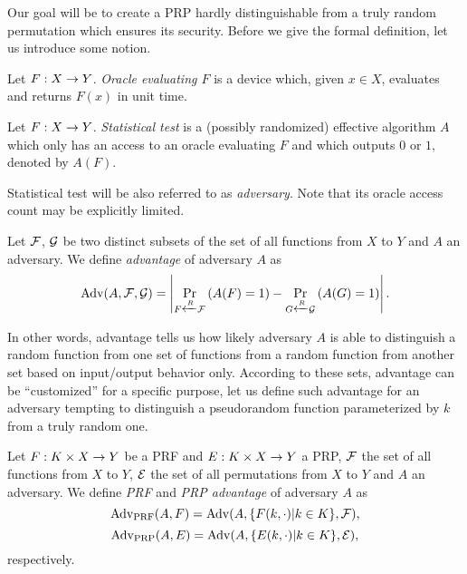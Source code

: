 Our goal will be to create a PRP hardly distinguishable from a truly random permutation which ensures its security. Before we give the formal definition, let us introduce some notion.

\begin{defn}[Oracle]
	Let $F:X\rightarrow Y$. {\em Oracle evaluating $F$} is a device which, given $x\in X$, evaluates and returns $F(x)$ in unit time.
\end{defn}

\begin{defn}   %
	Let $F:X\rightarrow Y$. {\em Statistical test} is a (possibly randomized) effective algorithm $A$ which only has an access to an oracle evaluating $F$ and which outputs $0$ or $1$, denoted by $A(F)$.
\end{defn}

\begin{note}
	Statistical test will be also referred to as {\em adversary}. Note that its oracle access count may be explicitly limited.
\end{note}


\begin{defn}[Advantage]
\label{def:advant}
	Let $\cal F$, $\cal G$ be two distinct subsets of the set of all functions from $X$ to $Y$ and $A$ an adversary. We define {\em advantage} of adversary $A$ as
	\[
		\operatorname*{Adv}(A,{\cal F},{\cal G}) = \left| \Pr\limits_{F\xleftarrow{R} {\cal F}}\left(A(F)=1\right) - \Pr\limits_{G\xleftarrow{R} {\cal G}}\left(A(G)=1\right) \right| .
	\]
\end{defn}

In other words, advantage tells us how likely adversary $A$ is able to distinguish a random function from one set of functions from a random function from another set based on input/output behavior only. According to these sets, advantage can be ``customized'' for a specific purpose, let us define such advantage for an adversary tempting to distinguish a pseudorandom function parameterized by $k$ from a truly random one.

\begin{defn}
\label{def:prfadvant}\label{def:prpadvant}
	Let $F: K\times X\rightarrow Y$ be a PRF and $E: K\times X\rightarrow Y$ a PRP, $\cal F$ the set of all functions from $X$ to $Y$, $\cal E$ the set of all permutations from $X$ to $Y$ and $A$ an adversary. We define {\em PRF} and {\em PRP advantage} of adversary $A$ as
	\[
		\operatorname*{Adv_{PRF}}(A,F) = \operatorname*{Adv}(A,\{F(k,\cdot)|k\in K\},{\cal F}) ,
	\]
	\[
		\operatorname*{Adv_{PRP}}(A,E) = \operatorname*{Adv}(A,\{E(k,\cdot)|k\in K\},{\cal E}) ,
	\]
	respectively.
\end{defn}

